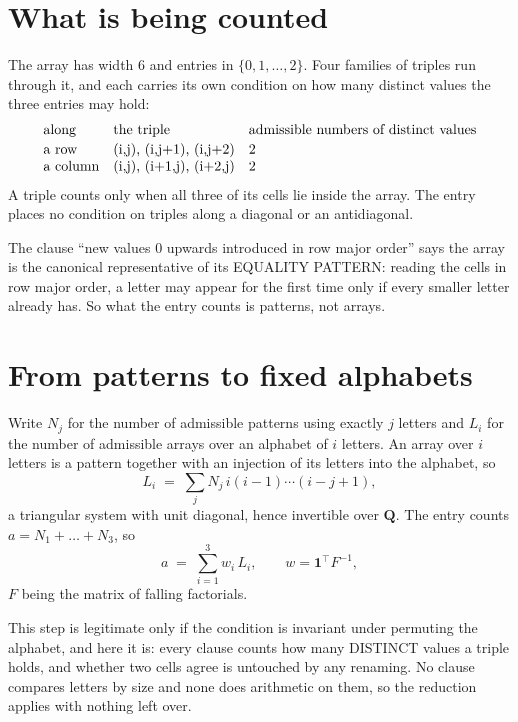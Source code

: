 \documentclass[11pt,a4paper]{article}
\theoremstyle{plain}
\theoremstyle{definition}
\begin{document}
\section{What is being counted}

The array has width $6$ and entries in $\{0,1,\dots,2\}$. Four families of triples
run through it, and each carries its own condition on how many distinct values the three
entries may hold:
\[
\begin{array}{lll}
\text{along} & \text{the triple} & \text{admissible numbers of distinct values} \\[2pt]
\text{a row} & $(i,j),\ (i,j+1),\ (i,j+2)$ & $2$ \\
\text{a column} & $(i,j),\ (i+1,j),\ (i+2,j)$ & $2$ \\
\end{array}
\]
A triple counts only when all three of its cells lie inside the array. The entry places no condition on triples along a diagonal or an antidiagonal.

The clause ``new values $0$ upwards introduced in row major order'' says the array is the
canonical representative of its EQUALITY PATTERN: reading the cells in row major order, a
letter may appear for the first time only if every smaller letter already has. So what the
entry counts is patterns, not arrays.

\section{From patterns to fixed alphabets}

Write $N_j$ for the number of admissible patterns using exactly $j$ letters and $L_i$ for the
number of admissible arrays over an alphabet of $i$ letters. An array over $i$ letters is a
pattern together with an injection of its letters into the alphabet, so
\[
L_i\;=\;\sum_j N_j\,i(i-1)\cdots(i-j+1),
\]
a triangular system with unit diagonal, hence invertible over $\mathbf{Q}$. The entry counts
$a=N_1+\dots+N_{3}$, so
\[
a\;=\;\sum_{i=1}^{3}w_i\,L_i ,\qquad w=\mathbf{1}^{\!\top}F^{-1},
\]
$F$ being the matrix of falling factorials.

This step is legitimate only if the condition is invariant under permuting the alphabet, and
here it is: every clause counts how many DISTINCT values a triple holds, and whether two cells
agree is untouched by any renaming. No clause compares letters by size and none does arithmetic
on them, so the reduction applies with nothing left over.
\end{document}
